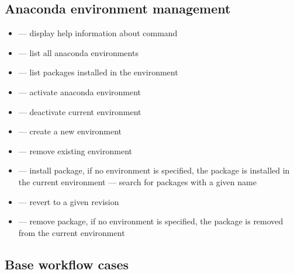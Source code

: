 \documentclass[12pt]{article}
\begin{document}
\subsection{Anaconda environment management}
\begin{itemize}
  \item {} --- display help information about command
  \item {} --- list all anaconda environments
  \item {} --- list packages installed in the environment
  \item {} --- activate anaconda environment
  \item {} --- deactivate current environment
  \item {} --- create a new environment
  \item {} --- remove existing environment
  \item {} --- install package, if no environment is specified, the package is installed in the current environment
  \emph {} --- search for packages with a given name
  \item {} --- revert to a given revision
  \item {} --- remove package, if no environment is specified, the package is removed from the current environment
\end{itemize}

\subsection{Base workflow cases}
\end{document}
